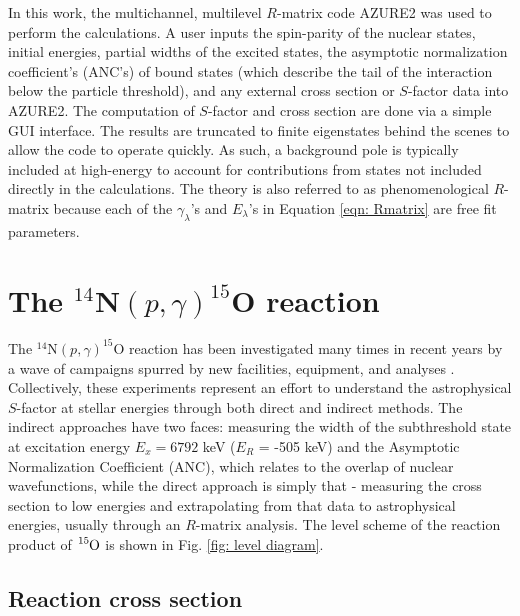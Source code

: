 In this work, the multichannel, multilevel $R$-matrix code AZURE2 \cite{Azuma2010} was used to perform the calculations. A user inputs the spin-parity of the nuclear states, initial energies, partial widths of the excited states, the asymptotic normalization coefficient's (ANC's) of bound states (which describe the tail of the interaction below the particle threshold), and any external cross section or $S$-factor data into AZURE2. The computation of $S$-factor and cross section are done via a simple GUI interface. The results are truncated to finite eigenstates behind the scenes to allow the code to operate quickly. As such, a background pole is typically included at high-energy to account for contributions from states not included directly in the calculations. The theory is also referred to as phenomenological $R$-matrix because each of the $\gamma_{\lambda}$'s and $E_{\lambda}$'s in Equation \ref{eqn: Rmatrix} are free fit parameters. 





\section{The $^{14}$N$\left( p,\gamma \right) ^{15}$O reaction}
\label{sec: 14N(p,g)}

The $^{14}$N$\left( p,\gamma \right) ^{15}$O reaction has been investigated many times in recent years by a wave of campaigns spurred by new facilities, equipment, and analyses \cite{Schroder1987, Bertone2001, Bertone2002, Formicola2004, Yamada2004, Imbriani2004, Imbriani2005, Runkle2005, Bemmerer2006, Lemut2006, Schurmann2008, Marta2008, Marta2010, Marta2011, Michelagnoli2013, Galinski2014, Szucs2015, Daigle2016, Li2016, Wagner2018}. Collectively, these experiments represent an effort to understand the astrophysical $S$-factor at stellar energies through both direct and indirect methods. The indirect approaches have two faces: measuring the width of the subthreshold state at excitation energy $E_{x} =6792$ keV ($E_{R}$ = -505 keV) and the Asymptotic Normalization Coefficient (ANC), which relates to the overlap of nuclear wavefunctions, while the direct approach is simply that - measuring the cross section to low energies and extrapolating from that data to astrophysical energies, usually through an $R$-matrix analysis. The level scheme of the reaction product of $\ce{^{15}O}$ is shown in Fig. \ref{fig: level diagram}.

\subsection{Reaction cross section}

